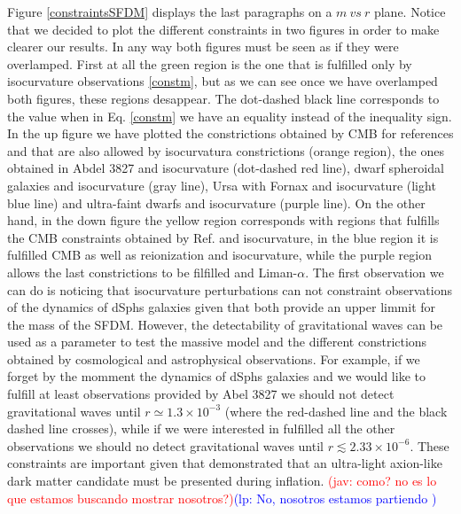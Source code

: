 \documentclass[amssymb,twocolumn,prd,nofootinbib,showpacs]{revtex4-1}
\newcommand{\jav}[1]{\textcolor{red}{(jav: #1)}}
\newcommand{\lp}[1]{\textcolor{blue}{(lp: #1)}}
\begin{document}
 Figure \ref{constraintsSFDM} displays the last paragraphs on a $m\ vs\ r$ plane. Notice that we decided to plot the different constraints in two figures in order to make clearer our results. In any way both figures must be seen as if they were overlamped. First at all the green region is the one that is fulfilled only by isocurvature observations \eqref{constm}, but as we can see once we have overlamped both figures, these regions desappear. The dot-dashed black line corresponds to the value when in Eq. \eqref{constm} we have an equality instead of the inequality sign.  In the up figure we have plotted the constrictions obtained by CMB for references \cite{SFphi41,SFphi42} and that are also allowed by isocurvatura constrictions (orange region), the ones obtained in Abdel 3827 and isocurvature (dot-dashed red line), dwarf spheroidal galaxies and isocurvature (gray line), Ursa with Fornax and isocurvature (light blue line) and ultra-faint dwarfs and isocurvature (purple line). On the other hand, in the down figure the yellow region corresponds with regions that fulfills the CMB constraints obtained by Ref. \cite{constn1} and isocurvature, in the blue region it is fulfilled CMB as well as reionization and isocurvature, while the purple region allows the last constrictions to be filfilled and Liman-$\alpha$. The first observation we can do is noticing that isocurvature perturbations can not constraint observations of the dynamics of dSphs galaxies given that both provide an upper limmit for the mass of the SFDM. However, the detectability of gravitational waves can be used as a parameter to test the massive model and the different constrictions obtained by cosmological and astrophysical observations. For example, if we forget by the momment the dynamics of dSphs galaxies and we would like to fulfill at least observations provided by Abel 3827 we should not detect gravitational waves until $r\simeq 1.3\times 10^{-3}$ (where the red-dashed line and the black dashed line crosses), while if we were interested in fulfilled all the other observations we should no detect gravitational waves until $r\lesssim 2.33\times 10^{-6}$. These constraints are important given that \cite{laldm} demonstrated that an ultra-light axion-like dark matter candidate must be presented during inflation. \jav{como? no es lo que estamos buscando mostrar nosotros?}\lp{No,  nosotros  estamos  partiendo
}
\end{document}

